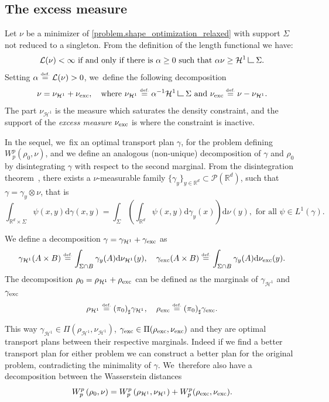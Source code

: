 \documentclass[10pt]{amsart}
\theoremstyle{definition}
\newcommand{\eqdef}{\ensuremath{\stackrel{\mbox{\upshape\tiny def.}}{=}}}
\newcommand\LM[1]{\hbox{\vrule width.5pt \vbox to#1pt{\vfill \hrule width#1pt height.5pt}}}
\newcommand\LL{{\mathchoice {\>\LM7\>}{\>\LM7\>}{\,\LM5\,}{\,\LM{3.35}\,}}}
\newcommand{\mres}{\LL}
\newcommand\cH{\mathcal{H}}
\newcommand{\RR}{\mathbb{R}}
\newcommand{\nuexc}{\nu_{\textup{exc}}}
\newcommand{\nuH}{\nu_{\cH^1}}
\newcommand{\rhoexc}{\rho_{\textup{exc}}}
\newcommand{\rhoH}{\rho_{\cH^1}}
\newcommand{\gammaexc}{\gamma_{\textup{exc}}}
\newcommand{\gammaH}{\gamma_{\cH^1}}
\newcommand\dd{\mathrm{d}}
\begin{document}
\subsection{The excess measure}
Let $\nu$ be a minimizer of \eqref{problem.shape_optimization_relaxed} with support
$\Sigma$ not reduced to a singleton. From the definition of the length functional we have:
\[
\mathcal{L}(\nu) < \infty \text{ if and only if there is $\alpha \ge 0$ such that } \alpha\nu \ge \cH^1\mres \Sigma.
\]
Setting $\alpha \eqdef \mathcal{L}(\nu)>0$, we~define the following decomposition
\begin{equation}\label{nuexceed}
\nu = \nuH + \nuexc,\quad
\text{where $\nuH \eqdef \alpha^{-1}\cH^1\mres \Sigma$ and $\nuexc \eqdef \nu - \nuH$}.
\end{equation}
The part $\nuH$ is the measure which saturates the density constraint, and the support of the \emph{excess measure} $\nuexc$ is where the constraint is inactive.

In the sequel, we~fix an optimal transport plan $\gamma$, for the problem defining $W_p^p(\rho_0, \nu)$, and we define an analogous (non-unique) decomposition of $\gamma$ and $\rho_0$ by disintegrating $\gamma$ with respect to the second marginal. From the disintegration theorem~\cite[Th.\,2.28]{ambrosio2000functions}, there exists a $\nu$-measurable family $\{\gamma_{y}\}_{y\in \RR^d} \subset \mathcal{P}(\RR^d)$, such that $\gamma= \gamma_y\otimes\nu$, that is\vspace*{-3pt}
\begin{equation}\label{disintegration_formula}
\int_{\RR^d \times \Sigma}
\psi(x, y)\dd \gamma(x,y)
=
\int_\Sigma
\left(
\int_{\RR^d} \psi(x,y)\dd \gamma_y(x)
\right)\dd\nu(y), \text{ for all $\psi \in L^1(\gamma)$}.
\end{equation}

We define a decomposition $\gamma = \gammaH + \gammaexc$ as
\begin{equation}\label{gammaexceed}
\gammaH(A\times B)\eqdef
\int_{\Sigma \cap B}
\gamma_y(A)
\dd\nuH(y),
\quad
\gammaexc(A\times B)\eqdef
\int_{\Sigma \cap B}
\gamma_y(A)
\dd\nuexc(y).
\end{equation}
The decomposition $\rho_0 = \rhoH + \rhoexc$ can be defined as the marginals of $\gammaH$ and $\gammaexc$
\begin{equation}\label{rhoexceed}
\rhoH \eqdef {(\pi_{0})}_\sharp \gammaH,
\quad
\rhoexc \eqdef {(\pi_{0})}_\sharp \gammaexc.
\end{equation}

This way $\gammaH \in \Pi(\rhoH, \nuH)$, $\gammaexc \in \Pi(\rhoexc, \nuexc)$ and they are optimal transport plans between their respective marginals. Indeed if we find a better transport plan for either problem we can construct a better plan for the original problem, contradicting the minimality of $\gamma$. We~therefore also have a decomposition between the Wasserstein distances\vspace*{-3pt}
\begin{equation}\label{rhoexc_decomposition_wasserstein}
W_p^p\left(\rho_0, \nu\right)
=
W_p^p\left(\rhoH, \nuH\right)
+
W_p^p(\rhoexc, \nuexc).
\end{equation}
\end{document}
